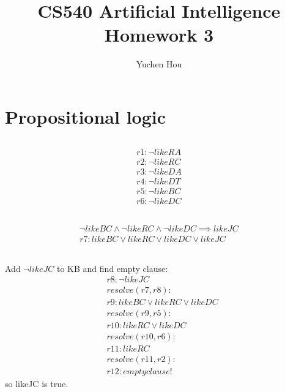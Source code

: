 \documentclass[12pt]{article}
\begin{document}
\title{CS540 Artificial Intelligence Homework 3}
\author{Yuchen Hou}
\maketitle

\section{Propositional logic}
\subsection{}
\begin{align*}
  r1: \neg likeRA \\
  r2: \neg likeRC \\
  r3: \neg likeDA \\
  r4: \neg likeDT \\
  r5: \neg likeBC \\
  r6: \neg likeDC
\end{align*}
\subsection{}
\begin{align*}
  \neg likeBC \land \neg likeRC \land \neg likeDC \implies likeJC \\
  r7: likeBC \lor likeRC \lor likeDC \lor likeJC
\end{align*}
\subsection{}
Add $\neg likeJC$ to KB and find empty clause:
\begin{align*}
  &r8: \neg likeJC \\
  &resolve(r7,r8): \\
  &r9: likeBC \lor likeRC \lor likeDC \\
  &resolve(r9,r5): \\
  &r10: likeRC \lor likeDC \\
  &resolve(r10,r6): \\
  &r11: likeRC \\
  &resolve(r11,r2): \\
  &r12: empty clause!
\end{align*}
so likeJC is true.
\end{document}
